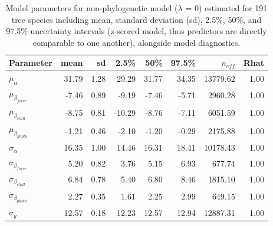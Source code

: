 \documentclass[11pt]{article}
\begin{document}
\begin{table}[ht]
\centering
\caption{Model parameters for non-phylogenetic model ($\lambda$ = 0) estimated for 191 tree species including mean, standard deviation (sd), 2.5\%, 50\%, and 97.5\% uncertainty intervals (z-scored model, thus predictors are directly comparable to one another), alongside model diagnostics.} 
\label{tab:modlamb0}
\begingroup\footnotesize
\begin{tabular}{lrrrrrrr}
  \hline
Parameter & mean & sd & 2.5\% & 50\% & 97.5\% & $n_{eff}$ & Rhat \\ 
  \hline
$\mu_{\alpha}$ & 31.79 & 1.28 & 29.29 & 31.77 & 34.35 & 13779.62 & 1.00 \\ 
  $\mu_{\beta_{force}}$ & -7.46 & 0.89 & -9.19 & -7.46 & -5.71 & 2960.28 & 1.00 \\ 
  $\mu_{\beta_{chill}}$ & -8.75 & 0.81 & -10.29 & -8.76 & -7.11 & 6051.59 & 1.00 \\ 
  $\mu_{\beta_{photo}}$ & -1.21 & 0.46 & -2.10 & -1.20 & -0.29 & 2175.88 & 1.00 \\ 
  $\sigma_{\alpha}$ & 16.35 & 1.00 & 14.46 & 16.31 & 18.41 & 10178.43 & 1.00 \\ 
  $\sigma_{\beta_{force}}$ & 5.20 & 0.82 & 3.76 & 5.15 & 6.93 & 677.74 & 1.00 \\ 
  $\sigma_{\beta_{chill}}$ & 6.84 & 0.78 & 5.40 & 6.80 & 8.46 & 1815.10 & 1.00 \\ 
  $\sigma_{\beta_{photo}}$ & 2.27 & 0.35 & 1.61 & 2.25 & 2.99 & 649.15 & 1.00 \\ 
  $\sigma_y$ & 12.57 & 0.18 & 12.23 & 12.57 & 12.94 & 12887.31 & 1.00 \\ 
   \hline
\end{tabular}
\endgroup
\end{table} \clearpage \pagebreak 
\end{document}
